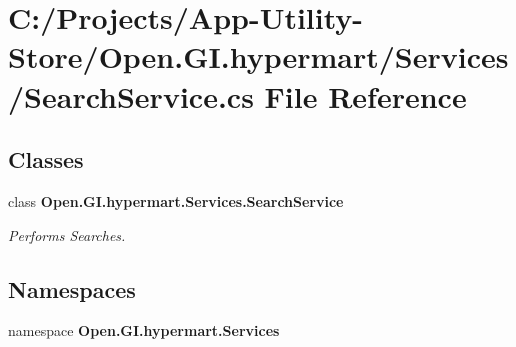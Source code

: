 \section{C\+:/\+Projects/\+App-\/\+Utility-\/\+Store/\+Open.G\+I.\+hypermart/\+Services/\+Search\+Service.cs File Reference}
\label{_search_service_8cs}
\subsection*{Classes}
\begin{DoxyCompactItemize}
\item 
class \textbf{ Open.\+G\+I.\+hypermart.\+Services.\+Search\+Service}
\begin{DoxyCompactList}\small\item\em Performs Searches. \end{DoxyCompactList}\end{DoxyCompactItemize}
\subsection*{Namespaces}
\begin{DoxyCompactItemize}
\item 
namespace \textbf{ Open.\+G\+I.\+hypermart.\+Services}
\end{DoxyCompactItemize}
